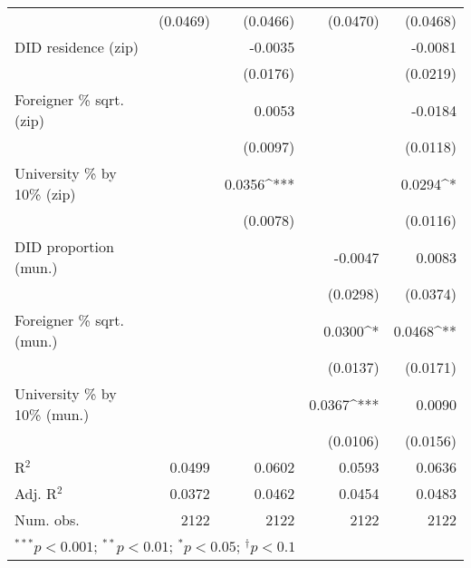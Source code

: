 \begin{tabular}{l D{.}{.}{4.11} D{.}{.}{4.11} D{.}{.}{4.11} D{.}{.}{4.11}}
                                  & (0.0469)         & (0.0466)          & (0.0470)         & (0.0468)          \\
DID residence (zip)               &                  & -0.0035           &                  & -0.0081           \\
                                  &                  & (0.0176)          &                  & (0.0219)          \\
Foreigner \% sqrt. (zip)          &                  & 0.0053            &                  & -0.0184           \\
                                  &                  & (0.0097)          &                  & (0.0118)          \\
University \% by 10\% (zip)       &                  & 0.0356^{***}      &                  & 0.0294^{*}        \\
                                  &                  & (0.0078)          &                  & (0.0116)          \\
DID proportion (mun.)             &                  &                   & -0.0047          & 0.0083            \\
                                  &                  &                   & (0.0298)         & (0.0374)          \\
Foreigner \% sqrt. (mun.)         &                  &                   & 0.0300^{*}       & 0.0468^{**}       \\
                                  &                  &                   & (0.0137)         & (0.0171)          \\
University \% by 10\% (mun.)      &                  &                   & 0.0367^{***}     & 0.0090            \\
                                  &                  &                   & (0.0106)         & (0.0156)          \\
\midrule
R$^2$                             & 0.0499           & 0.0602            & 0.0593           & 0.0636            \\
Adj. R$^2$                        & 0.0372           & 0.0462            & 0.0454           & 0.0483            \\
Num. obs.                         & 2122             & 2122              & 2122             & 2122              \\
\bottomrule
{}
\end{tabular}
